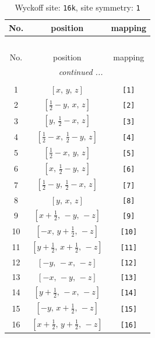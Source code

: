 \documentclass[fleqn,8pt]{jsarticle}
\begin{document}
\begin{longtable}{ccc}
\caption{Wyckoff site: {\tt 16k}, site symmetry: {\tt 1}}
 \\
 \hline \hline
No. & position & mapping \\ \hline \endfirsthead

\multicolumn{2}{l}{\tablename\ \thetable{}} \\
 \hline \hline
No. & position & mapping \\ \hline \endhead

 \hline \hline
\multicolumn{2}{r}{\footnotesize\it continued ...} \\ \endfoot

 \hline \hline
\multicolumn{2}{r}{} \\ \endlastfoot

1 & $\left[ x,\, y,\, z \right]$ & {\tt [1]} \\ \hline
2 & $\left[ \frac{1}{2} - y,\, x,\, z \right]$ & {\tt [2]} \\ \hline
3 & $\left[ y,\, \frac{1}{2} - x,\, z \right]$ & {\tt [3]} \\ \hline
4 & $\left[ \frac{1}{2} - x,\, \frac{1}{2} - y,\, z \right]$ & {\tt [4]} \\ \hline
5 & $\left[ \frac{1}{2} - x,\, y,\, z \right]$ & {\tt [5]} \\ \hline
6 & $\left[ x,\, \frac{1}{2} - y,\, z \right]$ & {\tt [6]} \\ \hline
7 & $\left[ \frac{1}{2} - y,\, \frac{1}{2} - x,\, z \right]$ & {\tt [7]} \\ \hline
8 & $\left[ y,\, x,\, z \right]$ & {\tt [8]} \\ \hline
9 & $\left[ x + \frac{1}{2},\, - y,\, - z \right]$ & {\tt [9]} \\ \hline
10 & $\left[ - x,\, y + \frac{1}{2},\, - z \right]$ & {\tt [10]} \\ \hline
11 & $\left[ y + \frac{1}{2},\, x + \frac{1}{2},\, - z \right]$ & {\tt [11]} \\ \hline
12 & $\left[ - y,\, - x,\, - z \right]$ & {\tt [12]} \\ \hline
13 & $\left[ - x,\, - y,\, - z \right]$ & {\tt [13]} \\ \hline
14 & $\left[ y + \frac{1}{2},\, - x,\, - z \right]$ & {\tt [14]} \\ \hline
15 & $\left[ - y,\, x + \frac{1}{2},\, - z \right]$ & {\tt [15]} \\ \hline
16 & $\left[ x + \frac{1}{2},\, y + \frac{1}{2},\, - z \right]$ & {\tt [16]} \\
\end{longtable}
\end{document}
